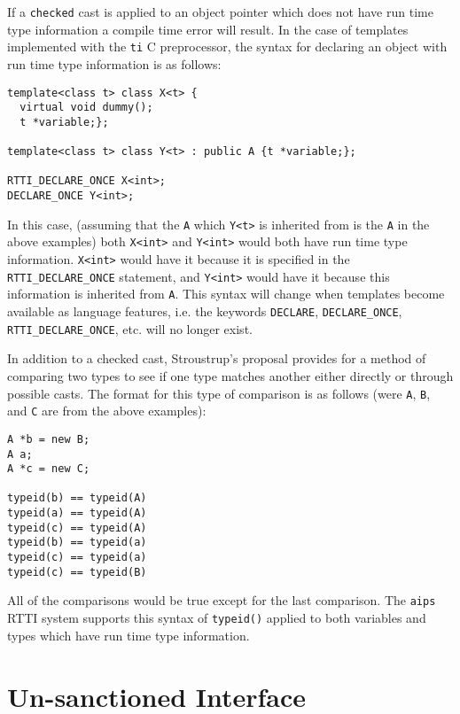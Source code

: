 If a {\tt checked} cast is applied to an object pointer which does not have 
run time type information a compile time error will result. In the case of 
templates implemented with the {\tt ti} C preprocessor, the syntax for declaring
an object with run time type information is as follows:
\begin{verbatim}
template<class t> class X<t> {
  virtual void dummy();
  t *variable;};

template<class t> class Y<t> : public A {t *variable;};

RTTI_DECLARE_ONCE X<int>;
DECLARE_ONCE Y<int>;
\end{verbatim}
\noindent
In this case, (assuming that the {\tt A} which {\tt Y<t>} is inherited from
is the {\tt A} in the above examples) both {\tt X<int>} and {\tt Y<int>}
would both have run time type information. {\tt X<int>} would have it because
it is specified in the {\tt RTTI\_DECLARE\_ONCE} statement, and {\tt Y<int>} 
would have it because this information is inherited from {\tt A}. This syntax
will change when templates become available as language features, i.e. the
keywords {\tt DECLARE}, {\tt DECLARE\_ONCE}, {\tt RTTI\_DECLARE\_ONCE}, etc.
will no longer exist.

In addition to a checked cast, Stroustrup's proposal provides for a method
of comparing two types to see if one type matches another either directly or
through possible casts. The format for this type of comparison is as follows
(were {\tt A}, {\tt B}, and {\tt C} are from the above examples):
\begin{verbatim}
A *b = new B;
A a;
A *c = new C;

typeid(b) == typeid(A)
typeid(a) == typeid(A)
typeid(c) == typeid(A)
typeid(b) == typeid(a)
typeid(c) == typeid(a)
typeid(c) == typeid(B)
\end{verbatim}
\noindent
All of the comparisons would be true except for the last comparison. The
{\tt aips} RTTI system supports this syntax of {\tt typeid()} applied to 
both variables and types which have run time type information.

\section{Un-sanctioned Interface}

